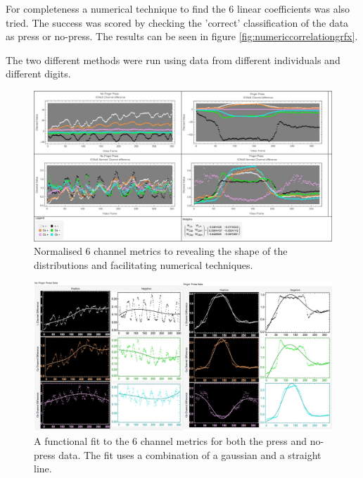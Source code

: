 For completeness a numerical technique to find the 6 linear coefficients was also tried. The success was scored by checking the 'correct' classification of the data as press or no-press. The results can be seen in figure \ref{fig:numericcorrelationgrfx}. 

The two different methods were run using data from different individuals and different digits. 


\begin{figure}[tbph]
\centering
\includegraphics[width=0.95\linewidth]{Chapter4/Figs/sixChannelsWeightsGrfx}
\caption[Normalised the 6 channel metrics]{Normalised 6 channel metrics to revealing the shape of the distributions and facilitating numerical techniques.}
\label{fig:sixchannelsweightsgrfx}
\end{figure}
\begin{figure}[tbph]
\centering
\includegraphics[width=0.95\linewidth]{Chapter4/Figs/sixChannelFitGrfx}
\caption{A functional fit to the 6 channel metrics for both the press and no-press data. The fit uses a combination of a gaussian and a straight line.}
\label{fig:sixchannelfitgrfx}
\end{figure}
